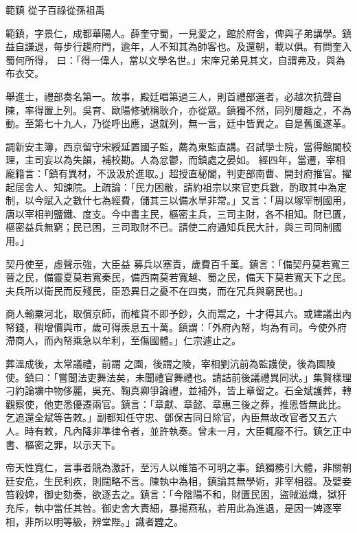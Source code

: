 
\begin{pinyinscope}

 範鎮
 從子百祿從孫祖禹



 範鎮，字景仁，成都華陽人。薛奎守蜀，一見愛之，館於府舍，俾與子弟講學。鎮益自謙退，每步行趨府門，逾年，人不知其為帥客也。及還朝，載以俱。有問奎入蜀何所得，
 曰：「得一偉人，當以文學名世。」宋庠兄弟見其文，自謂弗及，與為布衣交。



 舉進士，禮部奏名第一。故事，殿廷唱第過三人，則首禮部選者，必越次抗聲自陳，率得置上列。吳育、歐陽修號稱耿介，亦從眾。鎮獨不然，同列屢趣之，不為動。至第七十九人，乃從呼出應，退就列，無一言，廷中皆異之。自是舊風遂革。



 調新安主簿，西京留守宋綬延置國子監，薦為東監直講。召試學士院，當得館閣校理，主司妄以為失韻，補校勘。人為忿鬱，而鎮處之晏如。
 經四年，當遷，宰相龐籍言：「鎮有異材，不汲汲於進取。」超授直秘閣，判吏部南曹、開封府推官。擢起居舍人、知諫院。上疏論：「民力困敝，請約祖宗以來官吏兵數，酌取其中為定制，以今賦入之數什七為經費，儲其三以備水旱非常。」又言：「周以塚宰制國用，唐以宰相判鹽鐵、度支。今中書主民，樞密主兵，三司主財，各不相知。財已匱，樞密益兵無窮；民已困，三司取財不已。請使二府通知兵民大計，與三司同制國用。」



 契丹使至，虛聲示強，大臣益
 募兵以塞責，歲費百千萬。鎮言：「備契丹莫若寬三晉之民，備靈夏莫若寬秦民，備西南莫若寬越、蜀之民，備天下莫若寬天下之民。夫兵所以衛民而反殘民，臣恐異日之憂不在四夷，而在冗兵與窮民也。」



 商人輸粟河北，取償京師，而榷貨不即予鈔，久而鬻之，十才得其六。或建議出內帑錢，稍增價與市，歲可得羨息五十萬。鎮謂：「外府內帑，均為有司。今使外府滯商人，而內帑乘急以牟利，至傷國體。」仁宗遽止之。



 葬溫成後，太常議禮，前謂
 之園，後謂之陵，宰相劉沆前為監護使，後為園陵使。鎮曰：「嘗聞法吏舞法矣，未聞禮官舞禮也。請詰前後議禮異同狀。」集賢樣理刁約論壙中物侈麗，吳充、鞠真卿爭論禮，並補外，皆上章留之。石全斌護葬，轉觀察使，他吏悉優遷兩官。鎮言：「章獻、章懿、章惠三後之葬，推恩皆無此比。乞追還全斌等告敕。」副都知任守忠、鄧保吉同日除官，內臣無故改官者又五六人。時有敕，凡內降非準律令者，並許執奏。曾未一月，大臣輒廢不行。鎮乞正中
 書、樞密之罪，以示天下。



 帝天性寬仁，言事者競為激訐，至污人以帷箔不可明之事。鎮獨務引大體，非關朝廷安危，生民利疚，則闊略不言。陳執中為相，鎮論其無學術，非宰相器。及嬖妾笞殺婢，御史劾奏，欲逐去之。鎮言：「今陰陽不和，財匱民困，盜賊滋熾，獄犴充斥，執中當任其咎。御史舍大責細，暴揚燕私，若用此為進退，是因一婢逐宰相，非所以明等級，辨堂陛。」識者韙之。




\end{pinyinscope}
